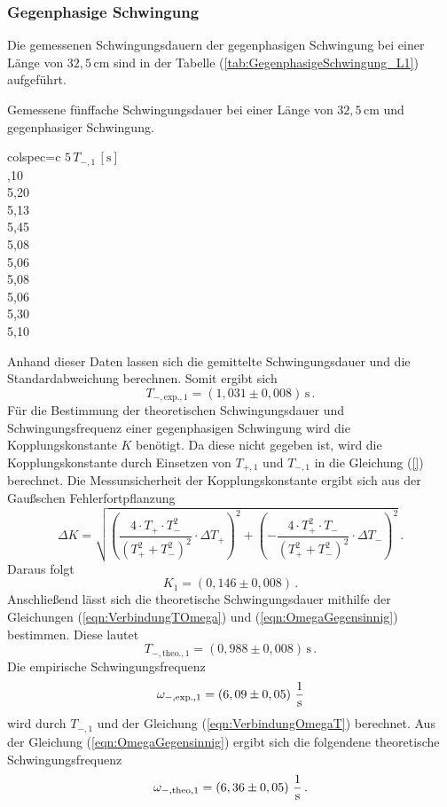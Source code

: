 \subsubsection{Gegenphasige Schwingung}
\label{sec:GegenphasigeSchwingung_KurzelPendel}
Die gemessenen Schwingungsdauern der gegenphasigen Schwingung bei einer Länge von $32,5\, \unit{\centi\meter}$ sind 
in der Tabelle (\ref{tab:GegenphasigeSchwingung_L1}) aufgeführt. 
\begin{table}[H]
  \centering
  \caption{Gemessene fünffache Schwingungsdauer bei einer Länge von $32,5\, \unit{\centi\meter}$ und gegenphasiger Schwingung.}
  \label{tab:GegenphasigeSchwingung_L1}
  \begin{tblr}{colspec={c}}
      \toprule
      $5\, T_{-, 1}\,\left[\unit{\second}\right]$\\
      ,10 \\
      5,20 \\
      5,13 \\
      5,45 \\
      5,08 \\
      5,06 \\
      5,08 \\
      5,06 \\
      5,30 \\
      5,10 \\
      \bottomrule
  \end{tblr}
\end{table}
Anhand dieser Daten lassen sich die gemittelte Schwingungsdauer und die Standardabweichung berechnen. Somit ergibt sich
$$T_{-,\text{exp.}, 1} = \left(1,031 \pm 0,008 \right)\, \unit{\second}\,.$$ 
Für die Bestimmung der theoretischen Schwingungsdauer und Schwingungsfrequenz einer gegenphasigen Schwingung wird die Kopplungskonstante $K$ benötigt. Da
diese nicht gegeben ist, wird die Kopplungskonstante durch Einsetzen von $T_{+,1}$ und $T_{-,1}$ in die Gleichung (\ref{}) berechnet. Die Messunsicherheit der Kopplungskonstante
ergibt sich aus der Gaußschen Fehlerfortpflanzung
$$\Delta K = \sqrt{\left(\frac{4 \cdot T_+\cdot T_{-}^{2}}{\left(T_{+}^{2} + T_{-}^{2}\right)^{2}}\cdot \Delta T_+\right)^{2}+ \left(-\frac{4\cdot T_{+}^{2}\cdot T_{-}}{\left(T_{+}^{2} + T_{-}^{2}\right)^{2}} \cdot \Delta T_{-}\right)^2}\,.$$
Daraus folgt
$$K_1 = \left( 0,146 \pm 0,008 \right)\,.$$
Anschließend lässt sich die theoretische Schwingungsdauer mithilfe der Gleichungen (\ref{eqn:VerbindungTOmega}) und (\ref{eqn:OmegaGegensinnig}) bestimmen. Diese lautet
$$T_{-,\text{theo.},1} = \left( 0,988 \pm 0,008 \right)\, \unit{\second}\,.$$
Die empirische Schwingungsfrequenz 
$$\omega_{-,\text{exp.},1} = \left( 6,09 \pm 0,05 \right)\, \unit[per-mode=fraction]{\per \second}$$ wird durch $T_{-,1}$ und der Gleichung (\ref{eqn:VerbindungOmegaT})
berechnet. Aus der Gleichung (\ref{eqn:OmegaGegensinnig}) ergibt sich die folgendene theoretische Schwingungsfrequenz
$$\omega_{-,\text{theo},1} = \left( 6,36 \pm 0,05 \right)\,\unit[per-mode=fraction]{\per \second}\,.$$
%
%
